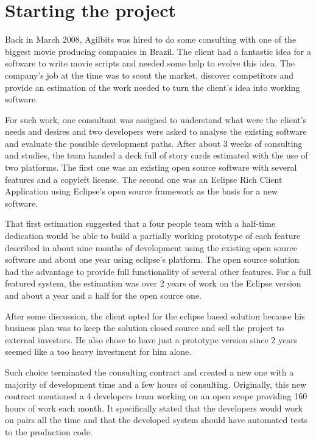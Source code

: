 \documentclass[lnbip]{svmultln}
\begin{document}
\section{Starting the project}
\label{sec:start}

Back in March 2008, Agilbits was hired to do some consulting with one
of the biggest movie producing companies in Brazil. The client had a
fantastic idea for a software to write movie scripts and needed some
help to evolve this idea. The company's job at the time was to scout
the market, discover competitors and provide an estimation of the work
needed to turn the client's idea into working software.

For such work, one consultant was assigned to understand what were the
client's needs and desires and two developers were asked to analyse
the existing software and evaluate the possible development
paths. After about 3 weeks of consulting and studies, the team handed
a deck full of story cards estimated with the use of two
platforms. The first one was an existing open source software with
several features and a copyleft license. The second one was an Eclipse
Rich Client Application using Eclipse's open source framework as the
basis for a new software.

That first estimation suggested that a four people team with a
half-time dedication would be able to build a partially working
prototype of each feature described in about nine months of
development using the existing open source software and about one year
using eclipse's platform. The open source solution had the advantage
to provide full functionality of several other features.  For a full
featured system, the estimation was over 2 years of work on the
Eclipse version and about a year and a half for the open source one.

After some discussion, the client opted for the eclipse based solution
because his business plan was to keep the solution closed source and
sell the project to external investors. He also chose to have just a
prototype version since 2 years seemed like a too heavy investment for
him alone.

Such choice terminated the consulting contract and created a new one
with a majority of development time and a few hours of
consulting. Originally, this new contract mentioned a 4 developers
team working on an open scope providing 160 hours of work each
month. It specifically stated that the developers would work on pairs
all the time and that the developed system should have automated tests
to the production code.
\end{document}
